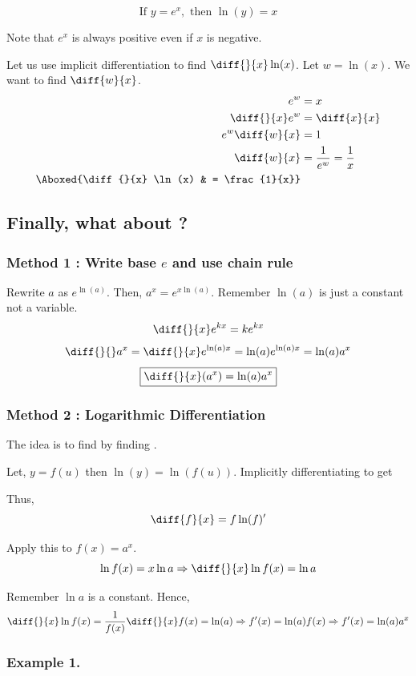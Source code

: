 $$
\boxed{\text{If } y = e^x, \text{ then } \ln(y) = x} 
$$

Note that $e^x$ is always positive even if $x$ is negative.

Let us use implicit differentiation to find $\diff{}{x} \ln(x)$. Let $w = \ln(x)$. We want to find $\diff{w}{x}$.
\begin{align*}
	e^w & = x \\
	\diff{}{x} e^w & = \diff{x}{x} \\
	e^w \diff{w}{x} & = 1 \\
	\diff{w}{x} & = \frac{1}{e^w} = \frac{1}{x} \\
	\Aboxed{\diff{}{x} \ln(x) & = \frac{1}{x}} 
\end{align*}

\subsection*{Finally, what about ?} 

\subsubsection{Method 1 : Write base $e$ and use chain rule}

Rewrite $a$ as $e^{\ln(a)}$. 
Then, $ a^x = e^{x \ln(a)} $.
Remember $\ln(a)$ is just a constant not a variable.
$$ \diff{}{x} e^{kx} = ke^{kx} $$
$$ \diff{}{} a^x = \diff{}{x} e^{\ln(a)x} = \ln(a)e^{\ln(a)x} = \ln(a)a^x $$
$$ \boxed{\diff{}{x}(a^x) = \ln(a)a^x}$$


\subsubsection{Method 2 : Logarithmic Differentiation}

The idea is to find  by finding .

Let, $y = f(u)$ then $\ln(y) = \ln(f(u))$.
Implicitly differentiating to get 

Thus, $$\diff{f}{x} = f\ln(f)'$$

Apply this to $f(x) = a^x$.
$$ \ln f(x) = x \ln a \Rightarrow \diff{}{x} \ln f(x) = \ln a $$

Remember $\ln a$ is a constant. Hence, 
$$ \diff{}{x} \ln f(x) = \frac{1}{f(x)} \diff{}{x} f(x) = \ln (a) \Rightarrow f'(x) = \ln(a)f(x) \Rightarrow f'(x) = \ln(a)a^x $$


\subsubsection{Example 1. }

